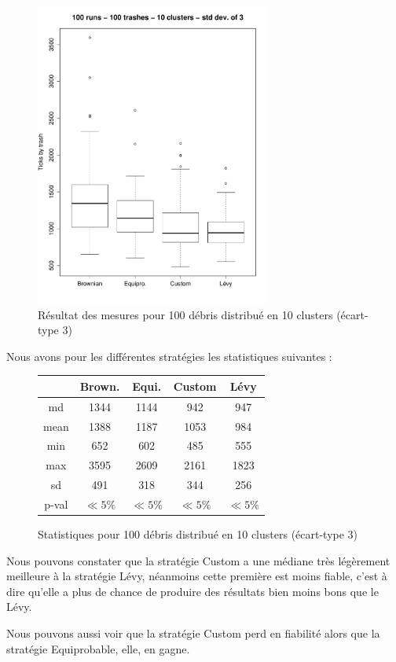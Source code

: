 

\begin{figure}[H]
	\begin{center}
		\includegraphics[height=10cm]{diagrams/100Tr10Clts_all.pdf}
		\caption{Résultat des mesures pour 100 débris distribué en 10 clusters (écart-type 3)}
		\label{fig:100Trashes_10Clusters}
	\end{center}
\end{figure}

Nous avons pour les différentes stratégies les statistiques suivantes :

\begin{figure}[H]
	\begin{center}
		\begin{tabular}{| c || c | c | c | c | }
			\hline
			&Brown.&Equi.&Custom&Lévy \\
			\hline
			\hline
			md&1344&1144&942&947\\
			mean&1388&1187&1053&984\\
			min & 652 & 602 & 485 & 555 \\
			max & 3595 & 2609 & 2161 & 1823 \\
			sd&491&318&344&256\\
			p-val&$\ll 5\%$&$\ll 5\%$&$\ll 5\%$&$\ll 5\%$\\
			\hline
		\end{tabular}
		\caption{Statistiques pour 100 débris distribué en 10 clusters (écart-type 3)}
	\end{center}
\end{figure}


Nous pouvons constater que la stratégie Custom a une médiane très
légèrement meilleure à la stratégie Lévy, néanmoins cette première
est moins fiable, c'est à dire qu'elle a plus de chance de produire
des résultats bien moins bons que le Lévy.

Nous pouvons aussi voir que la stratégie Custom perd en fiabilité
alors que la stratégie Equiprobable, elle, en gagne.